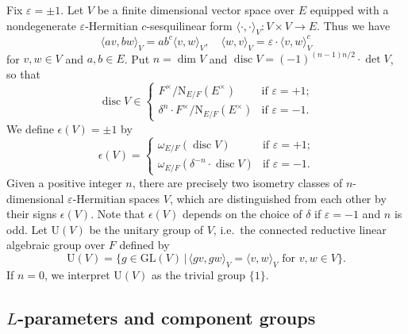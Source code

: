 \documentclass[11pt]{amsart}
\numberwithin{equation}{section}
\theoremstyle{plain}
\theoremstyle{definition}
\theoremstyle{remark}
\def\disc{\operatorname{disc}}
\def\GL{\mathrm{GL}}
\def\U{\mathrm{U}}
\begin{document}
Fix $\varepsilon = \pm 1$.
Let $V$ be a finite dimensional vector space over $E$ equipped with a nondegenerate $\varepsilon$-Hermitian $c$-sesquilinear form $\langle \cdot, \cdot \rangle_V : V \times V \rightarrow E$.
Thus we have
\[
 \langle a v, b w \rangle_V = a b^c \langle v, w \rangle_V, \quad
 \langle w, v \rangle_V = \varepsilon \cdot \langle v, w \rangle_V^c
\]
for $v, w \in V$ and $a, b \in E$.
Put $n = \dim V$ and $\disc V = (-1)^{(n-1)n/2} \cdot \det V$, so that 
\[
 \disc V \in
 \begin{cases}
  F^{\times} / \mathrm{N}_{E/F}(E^{\times})
  & \text{if $\varepsilon = +1$;} \\
  \delta^n \cdot F^{\times} / \mathrm{N}_{E/F}(E^{\times})
  & \text{if $\varepsilon = -1$.}
 \end{cases}
\]
We define $\epsilon(V) = \pm 1$ by 
\[
 \epsilon(V) = 
 \begin{cases}
  \omega_{E/F}(\disc V) & \text{if $\varepsilon = +1$;} \\
  \omega_{E/F}(\delta^{-n} \cdot \disc V) & \text{if $\varepsilon = -1$.}
 \end{cases}
\]
Given a positive integer $n$, there are precisely two isometry classes of $n$-dimensional $\varepsilon$-Hermitian spaces $V$, 
which are distinguished from each other by their signs $\epsilon(V)$.
Note that $\epsilon(V)$ depends on the choice of $\delta$ if $\varepsilon = -1$ and $n$ is odd.
Let $\U(V)$ be the unitary group of $V$, i.e.~the connected reductive linear algebraic group over $F$ defined by
\[
  \U(V) = \{ g \in \GL(V) \, | \,
 \text{$\langle g v, g w \rangle_V =  \langle v, w \rangle_V$ for $v, w \in V$}
 \}.
\]
If $n=0$, we interpret $\U(V)$ as the trivial group $\{ 1 \}$.

\subsection{$L$-parameters and component groups}
\end{document}
